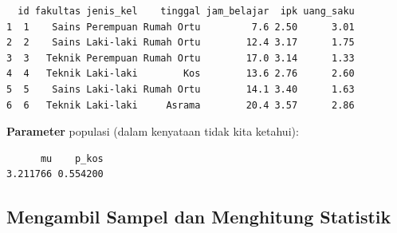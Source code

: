 \documentclass[
  indonesian,
  letterpaper,
]{book}
\newenvironment{Shaded}{\begin{snugshade}}{\end{snugshade}}
\newcommand{\AttributeTok}[1]{\textcolor[rgb]{0.40,0.45,0.13}{#1}}
\newcommand{\CommentTok}[1]{\textcolor[rgb]{0.37,0.37,0.37}{#1}}
\newcommand{\DecValTok}[1]{\textcolor[rgb]{0.68,0.00,0.00}{#1}}
\newcommand{\FloatTok}[1]{\textcolor[rgb]{0.68,0.00,0.00}{#1}}
\newcommand{\FunctionTok}[1]{\textcolor[rgb]{0.28,0.35,0.67}{#1}}
\newcommand{\NormalTok}[1]{\textcolor[rgb]{0.00,0.23,0.31}{#1}}
\newcommand{\OtherTok}[1]{\textcolor[rgb]{0.00,0.23,0.31}{#1}}
\newcommand{\SpecialCharTok}[1]{\textcolor[rgb]{0.37,0.37,0.37}{#1}}
\newcommand{\StringTok}[1]{\textcolor[rgb]{0.13,0.47,0.30}{#1}}
\begin{document}
\begin{Shaded}
\end{Shaded}

\begin{verbatim}
  id fakultas jenis_kel    tinggal jam_belajar  ipk uang_saku
1  1    Sains Perempuan Rumah Ortu         7.6 2.50      3.01
2  2    Sains Laki-laki Rumah Ortu        12.4 3.17      1.75
3  3   Teknik Perempuan Rumah Ortu        17.0 3.14      1.33
4  4   Teknik Laki-laki        Kos        13.6 2.76      2.60
5  5    Sains Laki-laki Rumah Ortu        14.1 3.40      1.63
6  6   Teknik Laki-laki     Asrama        20.4 3.57      2.86
\end{verbatim}

\textbf{Parameter} populasi (dalam kenyataan tidak kita ketahui):

\begin{Shaded}
\end{Shaded}

\begin{verbatim}
      mu    p_kos 
3.211766 0.554200 
\end{verbatim}

\subsection{Mengambil Sampel dan Menghitung
Statistik}\label{mengambil-sampel-dan-menghitung-statistik}
\end{document}
